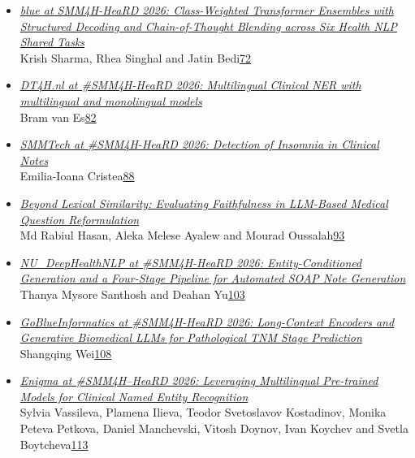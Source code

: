 \documentclass[11pt,oneside]{book}
\begin{document}
\begin{itemize}[leftmargin=*,label={}]
       \item \hyperlink{page.72}{\emph{blue at SMM4H-HeaRD 2026: Class-Weighted Transformer Ensembles with Structured Decoding and Chain-of-Thought Blending across Six Health NLP Shared Tasks}}\\ \hspace*{2em} Krish Sharma, Rhea Singhal and Jatin Bedi\dotfill \hyperlink{page.72}{72}
       \item \hyperlink{page.82}{\emph{DT4H.nl at \#SMM4H-HeaRD 2026: Multilingual Clinical NER with multilingual and monolingual models}}\\ \hspace*{2em} Bram van Es\dotfill \hyperlink{page.82}{82}
       \item \hyperlink{page.88}{\emph{SMMTech at \#SMM4H-HeaRD 2026: Detection of Insomnia in Clinical Notes}}\\ \hspace*{2em} Emilia-Ioana Cristea\dotfill \hyperlink{page.88}{88}
       \item \hyperlink{page.93}{\emph{Beyond Lexical Similarity: Evaluating Faithfulness in LLM-Based Medical Question Reformulation}}\\ \hspace*{2em} Md Rabiul Hasan, Aleka Melese Ayalew and Mourad Oussalah\dotfill \hyperlink{page.93}{93}
       \item \hyperlink{page.103}{\emph{NU\_DeepHealthNLP at \#SMM4H-HeaRD 2026: Entity-Conditioned Generation and a Four-Stage Pipeline for Automated SOAP Note Generation}}\\ \hspace*{2em} Thanya Mysore Santhosh and Deahan Yu\dotfill \hyperlink{page.103}{103}
       \item \hyperlink{page.108}{\emph{GoBlueInformatics at \#SMM4H-HeaRD 2026: Long-Context Encoders and Generative Biomedical LLMs for Pathological TNM Stage Prediction}}\\ \hspace*{2em} Shangqing Wei\dotfill \hyperlink{page.108}{108}
       \item \hyperlink{page.113}{\emph{Enigma at \#SMM4H–HeaRD 2026: Leveraging Multilingual Pre-trained Models for Clinical Named Entity Recognition}}\\ \hspace*{2em} Sylvia Vassileva, Plamena Ilieva, Teodor Svetoslavov Kostadinov, Monika Peteva Petkova, Daniel Manchevski, Vitosh Doynov, Ivan Koychev and Svetla Boytcheva\dotfill \hyperlink{page.113}{113}

\end{itemize}
\end{document}
